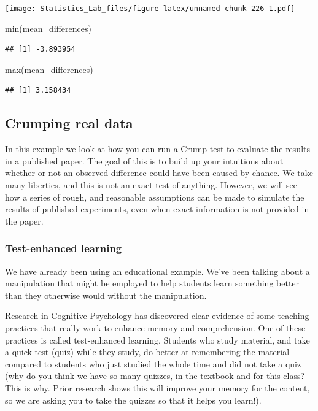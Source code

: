 \documentclass[
]{book}
\newenvironment{Shaded}{\begin{snugshade}}{\end{snugshade}}
\newcommand{\FunctionTok}[1]{\textcolor[rgb]{0.00,0.00,0.00}{#1}}
\newcommand{\NormalTok}[1]{#1}
\begin{document}
\texttt{[image: Statistics\_Lab\_files/figure-latex/unnamed-chunk-226-1.pdf]}

\begin{Shaded}
\begin{Highlighting}[]
\FunctionTok{min}\NormalTok{(mean\_differences)}
\end{Highlighting}
\end{Shaded}

\begin{verbatim}
## [1] -3.893954
\end{verbatim}

\begin{Shaded}
\begin{Highlighting}[]
\FunctionTok{max}\NormalTok{(mean\_differences)}
\end{Highlighting}
\end{Shaded}

\begin{verbatim}
## [1] 3.158434
\end{verbatim}

\hypertarget{crumping-real-data}{%
\subsection{Crumping real data}\label{crumping-real-data}}

In this example we look at how you can run a Crump test to evaluate the results in a published paper. The goal of this is to build up your intuitions about whether or not an observed difference could have been caused by chance. We take many liberties, and this is not an exact test of anything. However, we will see how a series of rough, and reasonable assumptions can be made to simulate the results of published experiments, even when exact information is not provided in the paper.

\hypertarget{test-enhanced-learning}{%
\subsubsection{Test-enhanced learning}\label{test-enhanced-learning}}

We have already been using an educational example. We've been talking about a manipulation that might be employed to help students learn something better than they otherwise would without the manipulation.

Research in Cognitive Psychology has discovered clear evidence of some teaching practices that really work to enhance memory and comprehension. One of these practices is called test-enhanced learning. Students who study material, and take a quick test (quiz) while they study, do better at remembering the material compared to students who just studied the whole time and did not take a quiz (why do you think we have so many quizzes, in the textbook and for this class? This is why. Prior research shows this will improve your memory for the content, so we are asking you to take the quizzes so that it helps you learn!).
\end{document}
